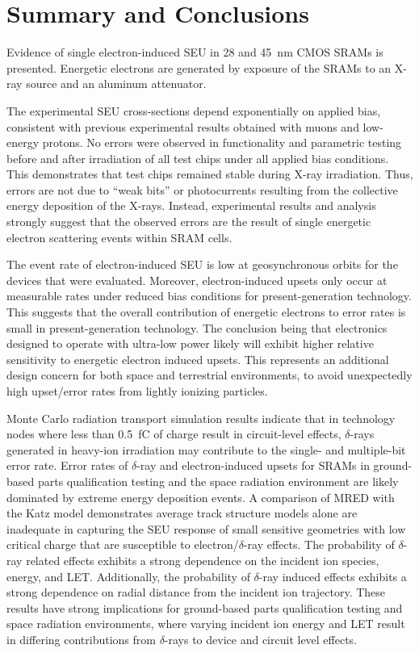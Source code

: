 \chapter{Summary and Conclusions} %
\label{cha:summary_and_conclusions}
Evidence of single electron-induced SEU in 28 and 45~nm CMOS SRAMs is presented. 
Energetic electrons are generated by exposure of the SRAMs to an X-ray source and an aluminum attenuator. 

The experimental SEU cross-sections depend exponentially on applied bias, consistent with previous experimental results obtained with muons and low-energy protons. 
No errors were observed in functionality and parametric testing before and after irradiation of all test chips under all applied bias conditions. 
This demonstrates that test chips remained stable during X-ray irradiation. 
Thus, errors are not due to ``weak bits'' or photocurrents resulting from the collective energy deposition of the X-rays. 
Instead, experimental results and analysis strongly suggest that the observed errors are the result of single energetic electron scattering events within SRAM cells. 

The event rate of electron-induced SEU is low at geosynchronous orbits for the devices that were evaluated. Moreover, electron-induced upsets only occur at measurable rates under reduced bias conditions for present-generation technology. 
This suggests that the overall contribution of energetic electrons to error rates is small in present-generation technology.
The conclusion being that electronics designed to operate with ultra-low power likely will exhibit higher relative sensitivity to energetic electron induced upsets. 
This represents an additional design concern for both space and terrestrial environments, to avoid unexpectedly high upset/error rates from lightly ionizing particles.

Monte Carlo radiation transport simulation results indicate that in technology nodes where less than 0.5~fC of charge result in circuit-level effects, $\delta$-rays generated in heavy-ion irradiation may contribute to the single- and multiple-bit error rate.
Error rates of $\delta$-ray and electron-induced upsets for SRAMs in ground-based parts qualification testing and the space radiation environment are likely dominated by extreme energy deposition events.
A comparison of MRED with the Katz model demonstrates average track structure models alone are inadequate in capturing the SEU response of small sensitive geometries with low critical charge that are susceptible to electron/$\delta$-ray effects.
The probability of $\delta$-ray related effects exhibits a strong dependence on the incident ion species, energy, and LET.
Additionally, the probability of $\delta$-ray induced effects exhibits a strong dependence on radial distance from the incident ion trajectory.
These results have strong implications for ground-based parts qualification testing and space radiation environments, where varying incident ion energy and LET result in differing contributions from $\delta$-rays to device and circuit level effects.
